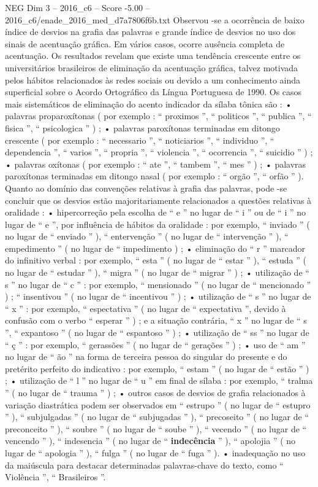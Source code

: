 \begin{textsample}{NEG Dim 3 – 2016\_c6 – Score -5.00 – 2016\_c6/enade\_2016\_med\_d7a7806f6b.txt}
Observou -se a ocorrência de baixo índice de desvios na grafia das palavras e grande índice de desvios no uso dos sinais de acentuação gráfica.
Em vários casos, ocorre ausência completa de acentuação.
Os resultados revelam que existe uma tendência crescente entre os universitários brasileiros de eliminação da acentuação gráfica, talvez motivada pelos hábitos relacionados às redes sociais ou devido a um conhecimento ainda superficial sobre o Acordo Ortográfico da Língua Portuguesa de 1990.
Os casos mais sistemáticos de eliminação do acento indicador da sílaba tônica são : • palavras proparoxítonas ( por exemplo : “ proximos ”, “ politicos ”, “ publica ”, “ fisica ”, “ psicologica ” ) ; • palavras paroxítonas terminadas em ditongo crescente ( por exemplo : “ necessario ”, “ noticiarios ”, “ individuo ”, “ dependencia ”, “ varios ”, “ propria ”, “ violencia ”, “ ocorrencia ”, “ suicidio ” ) ; • palavras oxítonas ( por exemplo : “ ate ”, “ tambem ”, “ mes ” ) ; • palavras paroxítonas terminadas em ditongo nasal ( por exemplo : “ orgão ”, “ orfão ” ).
Quanto ao domínio das convenções relativas à grafia das palavras, pode -se concluir que os desvios estão majoritariamente relacionados a questões relativas à oralidade : • hipercorreção pela escolha de “ e ” no lugar de “ i ” ou de “ i ” no lugar de “ e ”, por influência de hábitos da oralidade : por exemplo, “ inviado ” ( no lugar de “ enviado ” ), “ entervenção ” ( no lugar de “ intervenção ” ), “ empedimento ” ( no lugar de “ impedimento ) ; • eliminação do “ r ” marcador do infinitivo verbal : por exemplo, “ esta ” ( no lugar de “ estar ” ), “ estuda ” ( no lugar de “ estudar ” ), “ migra ” ( no lugar de “ migrar ” ) ; • utilização de “ s ” no lugar de “ c ” : por exemplo, “ mensionado ” ( no lugar de “ mencionado ” ) ; “ insentivou ” ( no lugar de “ incentivou ” ) ; • utilização de “ s ” no lugar de “ x ” : por exemplo, “ espectativa ” ( no lugar de “ expectativa ”, devido à confusão com o verbo “ esperar ” ) ; e a situação contrária, “ x ” no lugar de “ s ”, “ expantoso ” ( no lugar de “ espantoso ” ) ; • utilização de “ ss ” no lugar de “ ç ” : por exemplo, “ gerassões ” ( no lugar de “ gerações ” ) ; • uso de “ am ” no lugar de “ ão ” na forma de terceira pessoa do singular do presente e do pretérito perfeito do indicativo : por exemplo, “ estam ” ( no lugar de “ estão ” ) ; • utilização de “ l ” no lugar de “ u ” em final de sílaba : por exemplo, “ tralma ” ( no lugar de “ trauma ” ) ; • outros casos de desvios de grafia relacionados à variação diastrática podem ser observados em “ estrupo ” ( no lugar de “ estupro ” ), “ subjulgadas ” ( no lugar de “ subjugadas ” ), “ precoseito ” ( no lugar de “ preconceito ” ), “ soubre ” ( no lugar de “ soube ” ), “ vecendo ” ( no lugar de “ vencendo ” ), “ indesencia ” ( no lugar de “ \textbf{indecência} ” ), “ apolojia ” ( no lugar de “ apologia ” ), “ fulga ” ( no lugar de “ fuga ” ). • inadequação no uso da maiúscula para destacar determinadas palavras-chave do texto, como “ Violência ”, “ Brasileiros ”.

\end{textsample}
